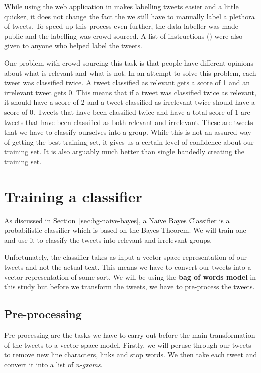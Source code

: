 While using the web application in  makes labelling tweets easier and a
little quicker, it does not change the fact the we still have to manually label a plethora of
tweets. To speed up this process even further, the data labeller was made public and the labelling
was crowd sourced. A list of instructions () were also given
to anyone who helped label the tweets.

One problem with crowd sourcing this task is that people have different opinions about what is
relevant and what is not. In an attempt to solve this problem, each tweet was classified twice. A
tweet classified as relevant gets a score of 1 and an irrelevant tweet gets 0. This means that if a
tweet was classified twice as relevant, it should have a score of 2 and a tweet classified as
irrelevant twice should have a score of 0. Tweets that have been classified twice and have a total
score of 1 are tweets that have been classified as both relevant and irrelevant. These are tweets
that we have to classify ourselves into a group. While this is not an assured way of getting the
best training set, it gives us a certain level of confidence about our training set. It is also
arguably much better than single handedly creating the training set.

\section{Training a classifier}
\label{sec:training-classifier}
As discussed in Section~\ref{sec:bg-naive-bayes}, a Na\"{i}ve Bayes Classifier is a probabilistic
classifier which is based on the Bayes Theorem. We will train one and use it to classify the tweets
into relevant and irrelevant groups.

Unfortunately, the classifier takes as input a vector space representation of our tweets and not the
actual text. This means we have to convert our tweets into a vector representation of some sort. We
will be using the \textbf{bag of words model} in this study but before we transform the tweets, we
have to pre-process the tweets.

\subsection{Pre-processing}
\label{sec:classification-preprocessing}
Pre-processing are the tasks we have to carry out before the main transformation of the tweets to a
vector space model. Firstly, we will peruse through our tweets to remove new line characters, links
and stop words. We then take each tweet and convert it into a list of \textit{n-grams}.


